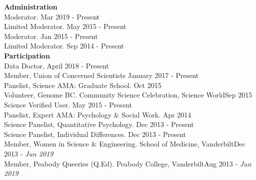 {\large \textbf{Administration}}\\
Moderator. \href{http://www.reddit.com/r/AcademicPsychology}{\color{blue}{AcademicPsychology, Reddit.com}}\hfill{Mar 2019 - Present}\smallskip\\
Limited Moderator. \href{http://www.reddit.com/r/Science}{\color{blue}{Science, Reddit.com}}\hfill{May 2015 - Present}\smallskip\\
Moderator. \href{http://www.reddit.com/r/GradAdmissions}{\color{blue}{GradAdmissions, Reddit.com}}\hfill{Jan 2015 - Present}\smallskip\\
Limited Moderator. \href{http://www.reddit.com/r/AskScience}{\color{blue}{AskScience, Reddit.com}}\hfill{Sep 2014 - Present}\medskip\\
%
%
{\large \textbf{Participation}}\\
Data Doctor, \href{https://www.wikitree.com}{\color{blue}{WikiTree}} \hfill{April 2018 - Present}\smallskip\\
Member, Union of Concerned Scientists \hfill{January 2017 - Present}\smallskip\\
Panelist, Science AMA: Graduate School. \href{http://www.reddit.com/r/AskScience}{\color{blue}{AskScience, Reddit.com}}\hfill{Oct 2015}\smallskip\\
Volunteer, Genome BC. Community Science Celebration, Science World\hfill{Sep 2015}\smallskip\\
Science Verified User. \href{http://www.reddit.com/r/science}{\color{blue}{Science, Reddit.com}}\hfill{May 2015 - Present}\smallskip\\
Panelist, Expert AMA: Psychology \& Social Work. \href{http://www.reddit.com/r/AskSocialScience}{\color{blue}{AskSocialScience, Reddit.com}}\hfill{Apr 2014}\smallskip\\
Science Panelist, Quantitative Psychology. \href{http://www.reddit.com/r/AskScience}{\color{blue}{AskScience, Reddit.com}}\hfill{Dec 2013 - Present}\smallskip\\%
Science Panelist, Individual Differences. \href{http://www.reddit.com/r/AskSocialScience}{\color{blue}{AskSocialScience, Reddit.com}}\hfill{Dec 2013 - Present}\smallskip\\
Member, Women in Science \& Engineering. School of Medicine, Vanderbilt\hfill{Dec 2013 - \textit{Jun 2019}}\smallskip\\
Member, Peabody Queeries (Q.Ed). Peabody College, Vanderbilt\hfill{Aug 2013 - \textit{Jun 2019}}%
%
%
